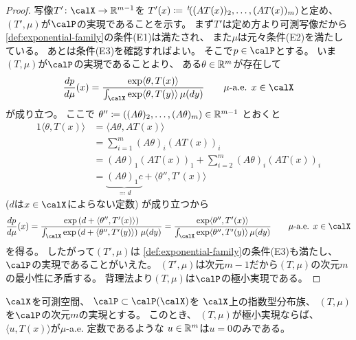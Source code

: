 \documentclass[report]{jlreq}
\begin{document}
\begin{proof}
    写像$T' \colon \calX \to \R^{m - 1}$を
    $T'(x) \coloneqq \,{}^{t}\!((AT(x))_2, \dots, (AT(x))_m)$と定め、
    $(T', \mu)$が$\calP$の実現であることを示す。
    まず$T'$は定め方より可測写像だから
    \cref{def:exponential-family}の条件(E1)は満たされ、
    また$\mu$は元々条件(E2)を満たしている。
    あとは条件(E3)を確認すればよい。
    そこで$p \in \calP$とする。
    いま$(T, \mu)$が$\calP$の実現であることより、
    ある$\theta \in \mathbb{R}^m$が存在して
    \begin{equation}
        \dd[p]{\mu}(x)
            = \frac{
                \exp\langle \theta, T(x) \rangle
            }{
                \int_{\calX} \exp\langle \theta, T(y) \rangle \, \mu(dy)
            }
            \qquad
            \text{$\mu$-a.e. $x \in \calX$}
    \end{equation}
    が成り立つ。
    ここで
    $\theta'' \coloneqq ((A\theta)_2, \dots, (A\theta)_m) \in \mathbb{R}^{m - 1}$
    とおくと
    \begin{alignat}{1}
        \langle \theta, T(x) \rangle
            &= \langle A\theta, AT(x) \rangle \\
            &= \sum_{i = 1}^m (A\theta)_i (AT(x))_i \\
            &= (A\theta)_1 (AT(x))_1 + \sum_{i = 2}^m (A\theta)_i (AT(x))_i \\
            &= \underbrace{(A\theta)_1 c}_{\eqqcolon d}
                + \langle \theta'', T'(x) \rangle
    \end{alignat}
    ($d$は$x \in \calX$によらない定数)
    が成り立つから
    \begin{equation}
        \dd[p]{\mu}(x)
            = \frac{
                \exp\myparen{d + \langle \theta'', T'(x) \rangle}
            }{
                \int_{\calX} \exp\myparen{d + \langle \theta'', T'(y) \rangle} \, \mu(dy)
            }
            = \frac{
                \exp \langle \theta'', T'(x) \rangle
            }{
                \int_{\calX} \exp \langle \theta'', T'(y) \rangle \, \mu(dy)
            }
            \qquad
            \text{$\mu$-a.e. $x \in \calX$}
    \end{equation}
    を得る。
    したがって$(T', \mu)$は
    \cref{def:exponential-family}の条件(E3)も満たし、
    $\calP$の実現であることがいえた。
    $(T', \mu)$は次元$m - 1$だから$(T, \mu)$の次元$m$の最小性に矛盾する。
    背理法より$(T, \mu)$は$\calP$の極小実現である。
\end{proof}

\begin{theorem}[極小実現の性質]
    $\calX$を可測空間、
    $\calP \subset \calP(\calX)$を
    $\calX$上の指数型分布族、
    $(T, \mu)$を$\calP$の次元$m$の実現とする。
    このとき、
    $(T, \mu)$が極小実現ならば、
    $\langle u, T(x) \rangle$が$\mu$-a.e. 定数であるような
    $u \in \mathbb{R}^m$は$u = 0$のみである。
\end{theorem}
\end{document}
